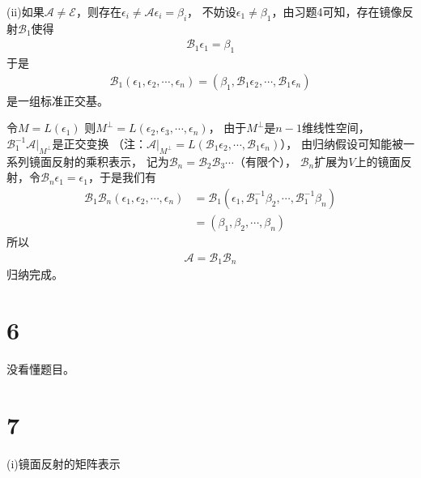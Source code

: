 \documentclass{article}
\begin{document}
(ii)如果$\mathscr{A} \neq \mathscr{E}$，则存在$\epsilon_i \neq \mathscr{A} \epsilon_i = \beta_i$，
不妨设$\epsilon_1 \neq \beta_1$，由习题4可知，存在镜像反射$\mathscr{B}_1$使得
\begin{align*}
  \mathscr{B}_1 \epsilon_1 = \beta_1
\end{align*}
于是
\begin{align*}
  \mathscr{B}_1(\epsilon_1, \epsilon_2, \cdots, \epsilon_n)
  = (\beta_1, \mathscr{B}_1 \epsilon_2, \cdots, \mathscr{B}_1 \epsilon_n)
\end{align*}
是一组标准正交基。

令$M = L(\epsilon_1)$
则$M^{\bot} = L(\epsilon_2, \epsilon_3, \cdots, \epsilon_n)$，
由于$M^{\bot}$是$n - 1$维线性空间，
$\mathscr{B}_1^{-1}\mathscr{A}|_{M^{\bot}}$是正交变换
（注：$\mathscr{A}|_{M^{\bot}} = L(\mathscr{B}_1 \epsilon_2, \cdots, \mathscr{B}_1 \epsilon_n)$），
由归纳假设可知能被一系列镜面反射的乘积表示，
记为$\mathscr{B}_{n} = \mathscr{B}_{2} \mathscr{B}_{3} \cdots$（有限个），
$\mathscr{B}_{n}$扩展为$V$上的镜面反射，令$\mathscr{B}_n \epsilon_1 = \epsilon_1$，于是我们有
\begin{align*}
  \mathscr{B}_1 \mathscr{B}_n (\epsilon_1, \epsilon_2, \cdots, \epsilon_n)
   & = \mathscr{B}_1(\epsilon_1, \mathscr{B}^{-1}_1 \beta_2, \cdots, \mathscr{B}^{-1}_1 \beta_n) \\
   & = (\beta_1, \beta_2, \cdots, \beta_n)
\end{align*}
所以
\begin{align*}
  \mathscr{A} = \mathscr{B}_1 \mathscr{B}_n
\end{align*}
归纳完成。

\section*{6}

没看懂题目。

\section*{7}

 (i)镜面反射的矩阵表示
\end{document}
